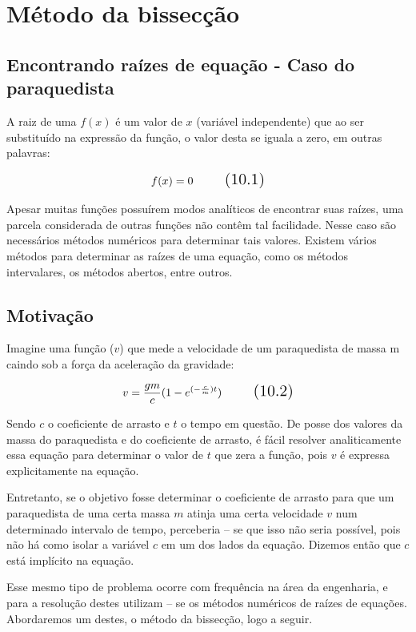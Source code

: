 \section{Método da bissecção}

\subsection{Encontrando raízes de equação - Caso do paraquedista}

A raiz de uma $f(x)$ é um valor de $x$ (variável independente) que ao ser substituído na expressão da função, o valor desta se iguala a zero, em outras palavras:

\begin{equation}
\Large f(x) = 0
\tag{10.1}
\end{equation}

Apesar muitas funções possuírem modos analíticos de encontrar suas raízes, uma parcela considerada de outras funções não contêm tal facilidade. Nesse caso são necessários métodos numéricos para determinar tais valores. Existem vários métodos para determinar as raízes de uma equação, como os métodos intervalares, os métodos abertos, entre outros.

\subsection{Motivação}

Imagine uma função ($v$) que mede a velocidade de um paraquedista de massa m caindo sob a força da aceleração da gravidade:

\begin{equation}
\Large v = \frac{gm}{c}(1-e^{(-\frac{c}{m})t})
\tag{10.2}
\end{equation}

Sendo $c$ o coeficiente de arrasto e $t$ o tempo em questão. De posse dos valores da massa do paraquedista e do coeficiente de arrasto, é fácil resolver analiticamente essa equação para determinar o valor de $t$ que zera a função, pois $v$ é expressa explicitamente na equação.

Entretanto, se o objetivo fosse determinar o coeficiente de arrasto para que um paraquedista de uma certa massa $m$ atinja uma certa velocidade $v$ num determinado intervalo de tempo, perceberia – se que isso não seria possível, pois não há como isolar a variável $c$ em um dos lados da equação. Dizemos então que $c$  está implícito na equação.

Esse mesmo tipo de problema ocorre com frequência na área da engenharia, e para a resolução destes utilizam – se os métodos numéricos de raízes de equações. Abordaremos um destes, o método da bissecção, logo a seguir.

